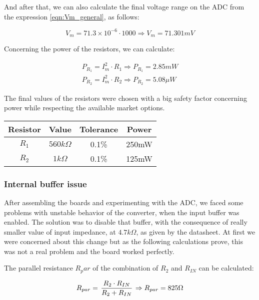 And after that, we can also calculate the final voltage range on the ADC from the expression \ref{eqn:Vm_general}, as follows:

\begin{equation}
V_m = 71.3 \times 10^{-6} \cdot 1000 \Rightarrow V_m = 71.301mV
\label{eqn:Vm_calculation}
\end{equation}

Concerning the power of the resistors, we can calculate:

\begin{equation}
\begin{split}
P_{R_1} = I_m^2 \cdot R_1 \Rightarrow P_{R_1} = 2.85mW \\
P_{R_2} = I_m^2 \cdot R_2 \Rightarrow P_{R_2} = 5.08\mu W
\end{split}
\label{eqn:Resistor_power}
\end{equation}

The final values of the resistors were chosen with a big safety factor concerning power while respecting the available market options.\\

\begin{center}
\begin{tabular}{ c c c c } 
 Resistor & Value & Tolerance & Power \\ \hline
 $R_1$ & $560k\Omega$ & 0.1\% & 250mW \\ 
 $R_2$ & $1k\Omega$ & 0.1\% & 125mW \\ 
\end{tabular}
\end{center}

\subsubsection{Internal buffer issue}
After assembling the boards and experimenting with the ADC, we faced some problems with unstable behavior of the converter, when the input buffer was enabled. The solution was to disable that buffer, with the consequence of really smaller value of input impedance, at $4.7k\Omega$, as given by the datasheet. At first we were concerned about this change but as the following calculations prove, this was not a real problem and the board worked perfectly.

The parallel resistance $R_par$ of the combination of $R_2$ and $R_{IN}$ can be calculated:

\begin{equation}
R_{par} = \left. R_2 \cdot R_{IN} \over R_2 + R_{IN} \right. \Rightarrow R_{par} = 825\Omega
\label{eqn:R_parallel}
\end{equation}

